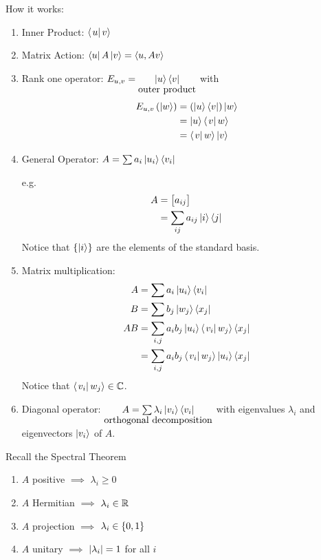 How it works:

\begin{enumerate}[label=\arabic*)]
    \item Inner Product: $\left\langle \left.u\right|v\right\rangle$
    \item Matrix Action: $\left\langle u\right|A\left|v\right\rangle = \left\langle u, Av\right\rangle$
    \item Rank one operator: $E_{u,v} = \underset{\hbox{outer product}}{\left|u\right\rangle\left\langle v\right|}$ with
          \begin{align*}E_{u, v}\left(\left|w\right\rangle\right)
               & = \left(\left|u\right\rangle\left\langle v\right|\right)\left|w\right\rangle \\
               & = \left|u\right\rangle\left\langle \left.v\right|w\right\rangle              \\
               & = \left\langle \left.v\right|w\right\rangle\left|v\right\rangle
          \end{align*}
    \item General Operator: $A = \sum a_i\left|u_i\right\rangle\left\langle v_i\right|$

          e.g. \begin{align*}A
               & = \begin{bmatrix}a_{ij}\end{bmatrix}     \\
               & = \sum_{ij}a_{ij}\left|i\right\rangle\left\langle j\right|
          \end{align*}
          Notice that $\left\lbrace\left|i\right\rangle\right\rbrace$ are the elements of the standard basis.
    \item Matrix multiplication:
          \begin{align*}
              A  & = \sum a_i\left|u_i\right\rangle\left\langle v_i\right|                             \\
              B  & = \sum b_{j}\left|w_j\right\rangle\left\langle x_j\right|                           \\
              AB & = \sum_{i,j} a_ib_j \left|u_i\right\rangle\left\langle \left.v_i\right|w_j\right\rangle\left\langle x_j\right| \\
                 & = \sum_{i,j}a_ib_j \left\langle \left.v_i\right|w_j\right\rangle\left|u_i\right\rangle\left\langle x_j\right|
          \end{align*}
          Notice that $\left\langle \left.v_i\right|w_j\right\rangle \in \mathbb{C}$.
    \item Diagonal operator: $\underset{\hbox{orthogonal decomposition}}{A = \sum\lambda_i\left|v_i\right\rangle\left\langle v_i\right|}$
          with eigenvalues $\lambda_i$ and eigenvectors $\left|v_i\right\rangle$ of $A$.
\end{enumerate}

Recall the Spectral Theorem
\begin{enumerate}
    \item $A$ positive $\implies$ $\lambda_i \geq 0$
    \item $A$ Hermitian $\implies$ $\lambda_i \in \mathbb{R}$
    \item $A$ projection $\implies$ $\lambda_i \in \left\lbrace0, 1\right\rbrace$
    \item $A$ unitary $\implies$ $\left\lvert\lambda_i\right\rvert = 1$ for all $i$
\end{enumerate}

